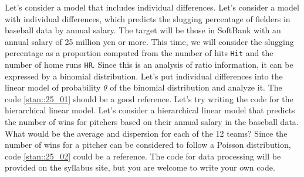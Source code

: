 \documentclass{ltjsbook}
\begin{document}
Let's consider a model that includes individual differences.
Let's consider a model with individual differences, which predicts the slugging percentage of fielders in baseball data by annual salary. The target will be those in SoftBank with an annual salary of 25 million yen or more. This time, we will consider the slugging percentage as a proportion computed from the number of hits \verb|Hit| and the number of home runs \verb|HR|. Since this is an analysis of ratio information, it can be expressed by a binomial distribution. Let's put individual differences into the linear model of probability $\theta$ of the binomial distribution and analyze it. The code \ref{stan::25_01} should be a good reference.
Let's try writing the code for the hierarchical linear model.
Let's consider a hierarchical linear model that predicts the number of wins for pitchers based on their annual salary in the baseball data. What would be the average and dispersion for each of the 12 teams? Since the number of wins for a pitcher can be considered to follow a Poisson distribution, code \ref{stan::25_02} could be a reference. The code for data processing will be provided on the syllabus site, but you are welcome to write your own code.
\end{document}
